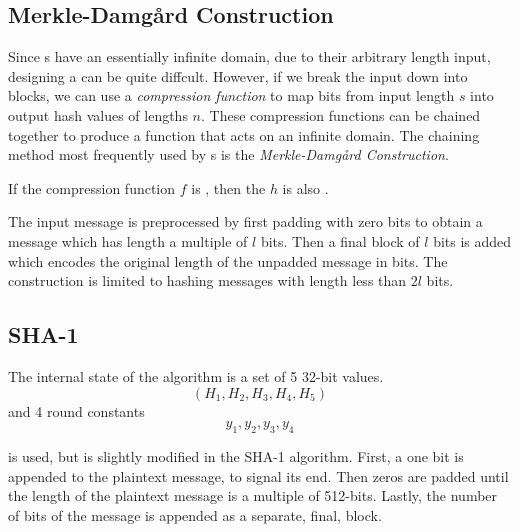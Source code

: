 \subsection{Merkle-Damg\r{a}rd Construction}\label{subsec:Merkle_Damgard_Construction}
\begin{definition}\label{def:Merkle_Damgard_Construction}
  Since s have an essentially infinite domain, due to their arbitrary length input, designing a  can be quite diffcult.
  However, if we break the input down into blocks, we can use a \emph{compression function} to map bits from input length $s$ into output hash values of lengths $n$.
  These compression functions can be chained together to produce a function that acts on an infinite domain.
  The chaining method most frequently used by s is the \emph{Merkle-Damg\r{a}rd Construction}.
\end{definition}

\begin{theorem}
  If the compression function $f$ is , then the  $h$ is also .
\end{theorem}

\begin{definition}\label{def:Length_Strengthening}
  The input message is preprocessed by first padding with zero bits to obtain a message which has length a multiple of $l$ bits.
  Then a final block of $l$ bits is added which encodes the original length of the unpadded message in bits.
  The construction is limited to hashing messages with length less than $2l$ bits.
\end{definition}

\subsection{SHA-1}\label{subsec:SHA_1}
The internal state of the algorithm is a set of 5 32-bit values.
\begin{equation*}
  (H_{1}, H_{2}, H_{3}, H_{4}, H_{5})
\end{equation*}
and 4 round constants
\begin{equation*}
  y_{1}, y_{2}, y_{3}, y_{4}
\end{equation*}

 is used, but is slightly modified in the SHA-1 algorithm.
First, a one bit is appended to the plaintext message, to signal its end.
Then zeros are padded until the length of the plaintext message is a multiple of 512-bits.
Lastly, the number of bits of the message is appended as a separate, final, block.

